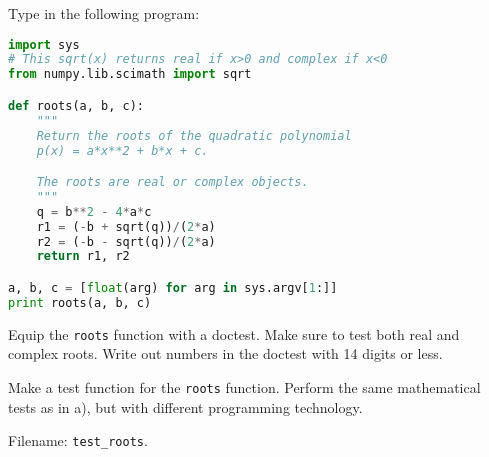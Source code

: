 \documentclass[graybox,sectrefs,envcountresetchap,open=right,final]{svmonodo}
\makeatletter
\newenvironment{doconceexercise}{}{}
\newcounter{doconceexercisecounter}%
\newcommand\listofexercises{
\chapter*{List of Exercises, Problems, and Projects
          \@mkboth{List of Exercises, Problems, and Projects}{List of Exercises, Problems, and Projects}}
\markboth{List of Exercises, Problems, and Projects}{List of Exercises, Problems, and Projects}
\@starttoc{loe}
}
\makeatother
\begin{document}
\begin{doconceexercise}

                
\label{softeng1:exer:doctest1}

Type in the following program:




















\begin{lstlisting}[language=python,style=blue1bar_bluegreen]
import sys
# This sqrt(x) returns real if x>0 and complex if x<0
from numpy.lib.scimath import sqrt

def roots(a, b, c):
    """
    Return the roots of the quadratic polynomial
    p(x) = a*x**2 + b*x + c.

    The roots are real or complex objects.
    """
    q = b**2 - 4*a*c
    r1 = (-b + sqrt(q))/(2*a)
    r2 = (-b - sqrt(q))/(2*a)
    return r1, r2

a, b, c = [float(arg) for arg in sys.argv[1:]]
print roots(a, b, c)

\end{lstlisting}


Equip the \texttt{roots} function with a doctest.
Make sure to test both real and complex roots.
Write out numbers in the doctest with 14 digits or less.


Make a test function for the \texttt{roots} function. Perform the
same mathematical tests as in a), but with different
programming technology.


\noindent Filename: \Verb!test_roots!.

\end{doconceexercise}
\end{document}

